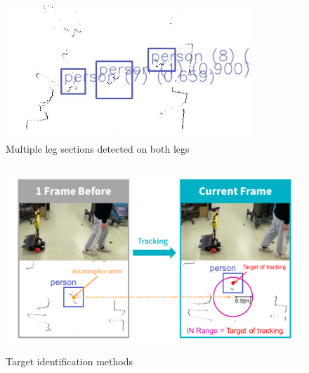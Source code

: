 \begin{figure}[h]
    \begin{center}
    \includegraphics[height=50mm,clip]{figure/yolo_image.jpg}
    \caption{Multiple leg sections detected on both legs}
    \label{yolo image}
    \end{center}
\end{figure}

\begin{figure}[h]
    \begin{center}
    \includegraphics[height=70mm,clip]{figure/Target-identification-methods.png}
    \caption{Target identification methods}
    \label{Target identification methods}
    \end{center}
\end{figure}

